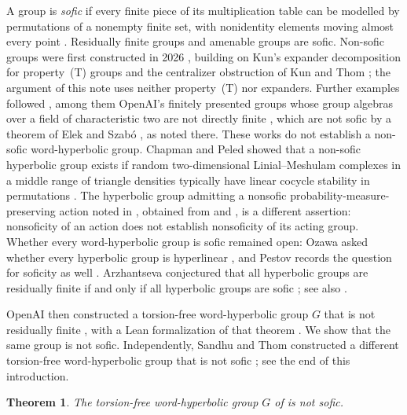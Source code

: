 \documentclass[11pt]{article}
\newtheorem{theorem}{Theorem}[section]
\theoremstyle{definition}
\theoremstyle{remark}
\numberwithin{equation}{section}
\begin{document}
A group is \emph{sofic} if every finite piece of its multiplication table can be modelled by permutations of a nonempty finite set, with nonidentity elements moving almost every point \cite{Gromov1999,Weiss2000,ElekSzabo2005}. Residually finite groups and amenable groups are sofic. Non-sofic groups were first constructed in 2026 \cite{OpenAI26}, building on Kun's expander decomposition for property~(T) groups \cite{Kun2019} and the centralizer obstruction of Kun and Thom \cite{KunThom2019}; the argument of this note uses neither property~(T) nor expanders. Further examples followed \cite{FournierFacio26,KunThom26,SauerSchesler26}, among them OpenAI's finitely presented groups whose group algebras over a field of characteristic two are not directly finite \cite{OAIdf2,OAI197}, which are not sofic by a theorem of Elek and Szab\'o \cite[Corollary~4.7]{ElekSzabo2004}, as noted there. These works do not establish a non-sofic word-hyperbolic group. Chapman and Peled showed that a non-sofic hyperbolic group exists if random two-dimensional Linial--Meshulam complexes in a middle range of triangle densities typically have linear cocycle stability in permutations \cite{ChapmanPeled25}. The hyperbolic group admitting a nonsofic probability-measure-preserving action noted in \cite[Section~1]{KunThom26}, obtained from \cite{OpenAI26} and \cite[Corollary~E]{AlekseevThom25}, is a different assertion: nonsoficity of an action does not establish nonsoficity of its acting group. Whether every word-hyperbolic group is sofic remained open: Ozawa asked whether every hyperbolic group is hyperlinear \cite[Introduction and Section~7]{Ozawa2004}, and Pestov records the question for soficity as well \cite[Open question~9.2]{Pestov2008}. Arzhantseva conjectured that all hyperbolic groups are residually finite if and only if all hyperbolic groups are sofic \cite[Conjecture~2.8]{Arzhantseva2014}; see also \cite[Conjecture~6.6]{ArzhantsevaCherix2024}.

OpenAI then constructed a torsion-free word-hyperbolic group $G$ that is not residually finite \cite[Theorem~1.1]{OAI252}, with a Lean formalization of that theorem \cite{OAImath}. We show that the same group is not sofic. Independently, Sandhu and Thom constructed a different torsion-free word-hyperbolic group that is not sofic \cite{SandhuThom26}; see the end of this introduction.

\begin{theorem}\label{thm:main}
The torsion-free word-hyperbolic group $G$ of \cite{OAI252} is not sofic.
\end{theorem}
\end{document}
